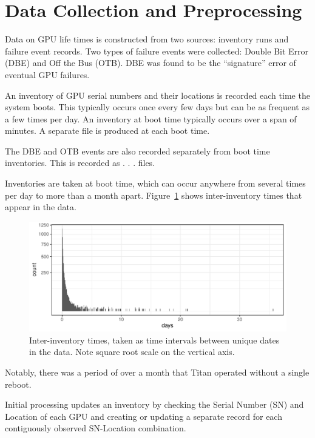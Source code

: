 \section{Data Collection and Preprocessing}
\label{sec:data}
Data on GPU life times is constructed from two sources: inventory runs
and failure event records. Two types of failure events were collected:
Double Bit Error (DBE) and Off the Bus (OTB). DBE was found to be the
``signature'' error of eventual GPU failures.

An inventory of GPU serial numbers and their locations is recorded
each time the system boots.  This typically occurs once every few days but
can be as frequent as a few times per day. An inventory at boot time
typically occurs over a span of  minutes. A separate file is
produced at each boot time.

The DBE and OTB events are also recorded separately from boot
time inventories. This is recorded as . . . files.

Inventories are taken at boot time, which can occur anywhere from
several times per day to more than a month
apart. Figure~\ref{fig:inventory} shows inter-inventory times that
appear in the data.
\begin{figure}[bth]
  \begin{center}
    \includegraphics[width=\columnwidth]{figs/attention_intervals001.pdf}
  \end{center}
  \caption{Inter-inventory times, taken as time intervals between
    unique dates in the data. Note square root scale on the vertical
    axis.}
  \label{fig:inventory}
\end{figure}
Notably, there was a period of over a month that Titan operated
without a single reboot.

Initial processing updates an inventory by checking the Serial Number
(SN) and Location of each GPU and creating or updating a separate
record for each contiguously observed SN-Location combination.


